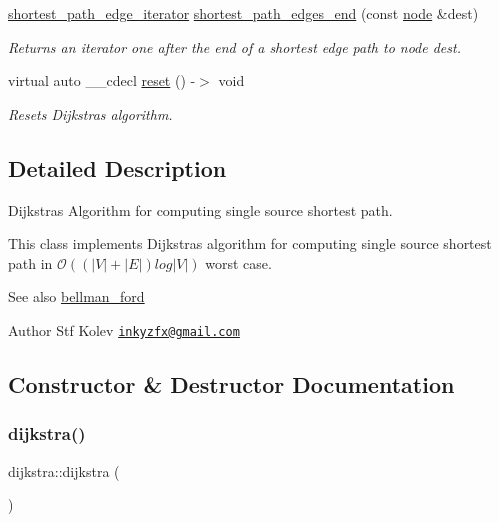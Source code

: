 \begin{DoxyCompactItemize}
\mbox{\hyperlink{classdijkstra_ad35d95d4ed7a4202a5d048a63aa115b9}{shortest\+\_\+path\+\_\+edge\+\_\+iterator}} \mbox{\hyperlink{classdijkstra_a031e6fef10aa40aad10edc1053ad9cf0}{shortest\+\_\+path\+\_\+edges\+\_\+end}} (const \mbox{\hyperlink{classnode}{node}} \&dest)
\begin{DoxyCompactList}\small\item\em Returns an iterator one after the end of a shortest edge path to node {\ttfamily dest}. \end{DoxyCompactList}\item 
virtual auto \+\_\+\+\_\+cdecl \mbox{\hyperlink{classdijkstra_a1b767b039cb69c422c5cc3247246e951}{reset}} () -\/$>$ void
\begin{DoxyCompactList}\small\item\em Resets Dijkstra\textquotesingle{}s algorithm. \end{DoxyCompactList}\end{DoxyCompactItemize}


\subsection{Detailed Description}
Dijkstra\textquotesingle{}s Algorithm for computing single source shortest path. 

This class implements Dijkstra\textquotesingle{}s algorithm for computing single source shortest path in $\mathcal{O}((|V| + |E|) log |V|)$ worst case.

\begin{DoxySeeAlso}{See also}
\mbox{\hyperlink{classbellman__ford}{bellman\+\_\+ford}}
\end{DoxySeeAlso}
\begin{DoxyAuthor}{Author}
Stf Kolev \href{mailto:inkyzfx@gmail.com}{\tt inkyzfx@gmail.\+com} 
\end{DoxyAuthor}


\subsection{Constructor \& Destructor Documentation}
\mbox{\label{classdijkstra_a64a1fcb9cca32ff932b9b98a08cff106}} 
\subsubsection{\texorpdfstring{dijkstra()}{dijkstra()}}
{\footnotesize\ttfamily dijkstra\+::dijkstra (\begin{DoxyParamCaption}{ }\end{DoxyParamCaption})}



